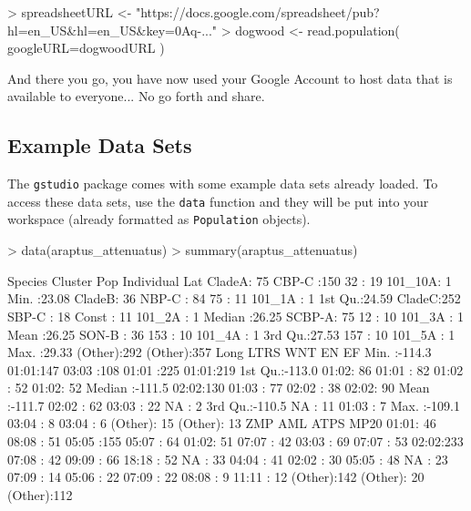 \documentclass[letterpaper,twoside,openany]{book}
\begin{document}
\begin{Schunk}
\begin{Sinput}
> spreadsheetURL <- "https://docs.google.com/spreadsheet/pub?hl=en_US&hl=en_US&key=0Aq-..."
> dogwood <- read.population( googleURL=dogwoodURL )
\end{Sinput}
\end{Schunk}

And there you go, you have now used your Google Account to host data that is available to everyone...  No go forth and share.

\subsection{Example Data Sets}

The \texttt{gstudio} package comes with some example data sets already loaded.  To access these data sets, use the \texttt{data} function and they will be put into your workspace (already formatted as \texttt{Population} objects).

\begin{Schunk}
\begin{Sinput}
> data(araptus_attenuatus)
> summary(araptus_attenuatus)
\end{Sinput}
\begin{Soutput}
   Species      Cluster         Pop        Individual       Lat       
 CladeA: 75   CBP-C :150   32     : 19   101_10A:  1   Min.   :23.08  
 CladeB: 36   NBP-C : 84   75     : 11   101_1A :  1   1st Qu.:24.59  
 CladeC:252   SBP-C : 18   Const  : 11   101_2A :  1   Median :26.25  
              SCBP-A: 75   12     : 10   101_3A :  1   Mean   :26.25  
              SON-B : 36   153    : 10   101_4A :  1   3rd Qu.:27.53  
                           157    : 10   101_5A :  1   Max.   :29.33  
                           (Other):292   (Other):357                  
      Long           LTRS          WNT            EN          EF     
 Min.   :-114.3   01:01:147   03:03  :108   01:01  :225   01:01:219  
 1st Qu.:-113.0   01:02: 86   01:01  : 82   01:02  : 52   01:02: 52  
 Median :-111.5   02:02:130   01:03  : 77   02:02  : 38   02:02: 90  
 Mean   :-111.7               02:02  : 62   03:03  : 22   NA   :  2  
 3rd Qu.:-110.5               NA     : 11   01:03  :  7              
 Max.   :-109.1               03:04  :  8   03:04  :  6              
                              (Other): 15   (Other): 13              
    ZMP           AML           ATPS          MP20    
 01:01: 46   08:08  : 51   05:05  :155   05:07  : 64  
 01:02: 51   07:07  : 42   03:03  : 69   07:07  : 53  
 02:02:233   07:08  : 42   09:09  : 66   18:18  : 52  
 NA   : 33   04:04  : 41   02:02  : 30   05:05  : 48  
             NA     : 23   07:09  : 14   05:06  : 22  
             07:09  : 22   08:08  :  9   11:11  : 12  
             (Other):142   (Other): 20   (Other):112  
\end{Soutput}
\end{Schunk}
\end{document}
